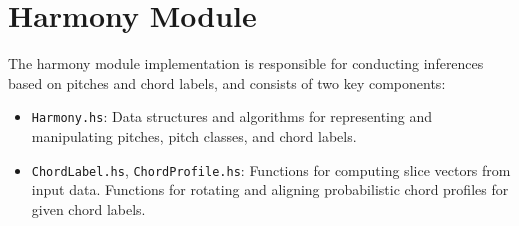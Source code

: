 \documentclass[12pt,a4paper,twoside,openany]{report} \usepackage[pdfborder={0 0 0}]{hyperref}    %
\theoremstyle{definition} \newtheorem{definition}{Definition}[section]
\begin{document}




    \section{Harmony Module}
    \label{sec:harmonyModel}
    The harmony module implementation is responsible for conducting inferences based on pitches and chord labels, and consists of two key components:

    \begin{itemize}
      \item \texttt{Harmony.hs}: Data structures and algorithms for representing and manipulating pitches, pitch classes, and chord labels.
      \item \texttt{ChordLabel.hs}, \texttt{ChordProfile.hs}: Functions for computing slice vectors from input data. Functions for rotating and aligning probabilistic chord profiles for given chord labels.
    \end{itemize}
\end{document}
